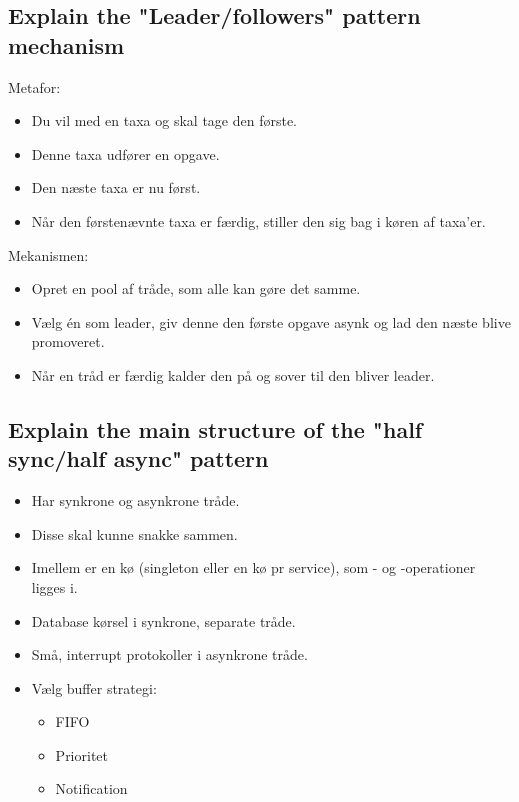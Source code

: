 \documentclass{article}
\begin{document}
\subsection{Explain the "Leader/followers" pattern mechanism}
Metafor:
\vspace{-10pt}
\begin{itemize}
	\item Du vil med en taxa og skal tage den første.
	\item Denne taxa udfører en opgave.
	\item Den næste taxa er nu først.
	\item Når den førstenævnte taxa er færdig, stiller den sig bag i køren af taxa'er.
\end{itemize}

Mekanismen:
\vspace{-10pt}
\begin{itemize}
	\item Opret en pool af tråde, som alle kan gøre det samme.
	\item Vælg én som leader, giv denne den første opgave asynk og lad den næste blive promoveret.
	\item Når en tråd er færdig kalder den  på  og sover til den bliver leader.
\end{itemize}


\subsection{Explain the main structure of the "half sync/half async" pattern}

\begin{itemize}
	\item Har synkrone og asynkrone tråde.
	\item Disse skal kunne snakke sammen.
	\item Imellem er en kø (singleton eller en kø pr service), som - og -operationer ligges i.
	\item Database kørsel i synkrone, separate tråde.
	\item Små, interrupt protokoller i asynkrone tråde.
	\item Vælg buffer strategi:
	\begin{itemize}
		\item FIFO
		\item Prioritet
		\item Notification 
	\end{itemize}
\end{itemize}
\end{document}
